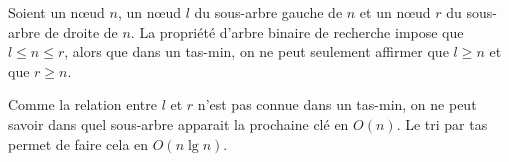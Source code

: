 \begin{description}
\begin{ex}
    Soient un nœud $n$, un nœud $l$ du sous-arbre gauche de $n$ et  un nœud $r$ du sous-arbre de droite de $n$. La propriété d'arbre binaire de recherche impose que $l \le n \le r$, alors que dans un tas-min, on ne peut seulement affirmer que $l \ge n$ et que $r \ge n$.

    Comme la relation entre $l$ et $r$ n'est pas connue dans un tas-min, on ne peut savoir dans quel sous-arbre apparait la prochaine clé en $O(n)$. Le tri par tas permet de faire cela en $O(n\lg n)$.  
\end{ex}

\end{description}
